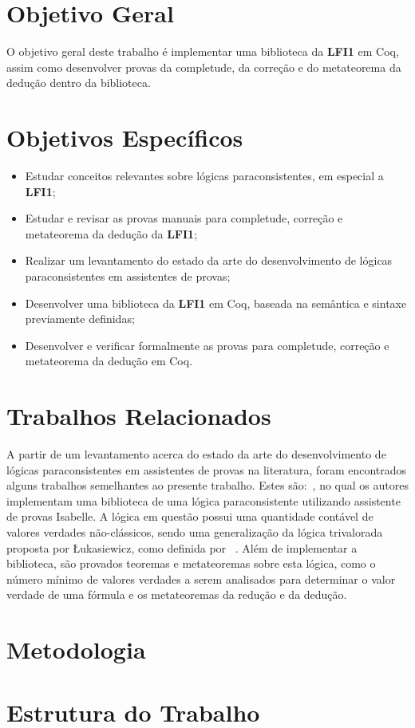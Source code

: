     \section{Objetivo Geral}
    O objetivo geral deste trabalho é implementar uma biblioteca da \textbf{LFI1} em Coq, assim como desenvolver provas da completude, da correção e do metateorema da dedução dentro da biblioteca.


    \section{Objetivos Específicos}
    \begin{itemize}
        \item Estudar conceitos relevantes sobre lógicas paraconsistentes, em especial a \textbf{LFI1};
        \item Estudar e revisar as provas manuais para completude, correção e metateorema da dedução da \textbf{LFI1};
        \item Realizar um levantamento do estado da arte do desenvolvimento de lógicas paraconsistentes em assistentes de provas;
        \item Desenvolver uma biblioteca da \textbf{LFI1} em Coq, baseada na semântica e sintaxe previamente definidas;
        \item Desenvolver e verificar formalmente as provas para completude, correção e metateorema da dedução em Coq.
    \end{itemize}


    \section{Trabalhos Relacionados}
    A partir de um levantamento acerca do estado da arte do desenvolvimento de lógicas paraconsistentes em assistentes de provas na literatura, foram encontrados alguns trabalhos semelhantes ao presente trabalho. Estes são:~\cite{Villadsen2017}, no qual os autores implementam uma biblioteca de uma lógica paraconsistente utilizando assistente de provas Isabelle. A lógica em questão possui uma quantidade  contável de valores verdades não-clássicos, sendo uma generalização da lógica trivalorada proposta por {\L}ukasiewicz, como definida por ~. Além de implementar a biblioteca, são provados teoremas e metateoremas sobre esta lógica, como o número mínimo de valores verdades a serem analisados para determinar o valor verdade de uma fórmula e os metateoremas da redução e da dedução.


    \section{Metodologia}
        

    \section{Estrutura do Trabalho}
       